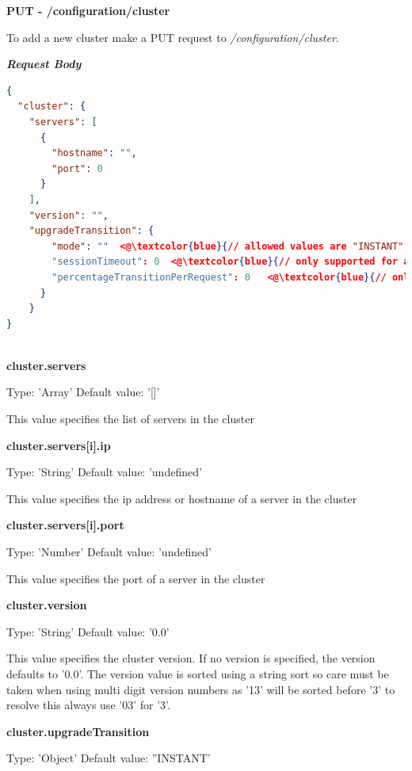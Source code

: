 \documentclass[a4paper,11pt,twoside]{report}
\begin{document}
\noindent
\textbf{PUT - /configuration/cluster}

\noindent
To add a new cluster make a PUT request to \textit{/configuration/cluster}.\bigskip

\noindent
\textit{\textbf{Request Body}}
 
\begin{lstlisting}[language=json]
{
  "cluster": {
    "servers": [
      {
        "hostname": "",
        "port": 0
      }
    ],
    "version": "",
    "upgradeTransition": {
        "mode": ""  <@\textcolor{blue}{// allowed values are "INSTANT", "SESSION", "GRADUAL", "CONCURRENT"}@>
        "sessionTimeout": 0  <@\textcolor{blue}{// only supported for a 'mode' value of "SESSION"}@> 
        "percentageTransitionPerRequest": 0   <@\textcolor{blue}{// only supported for "GRADUAL" mode}@>
      }
    }
}
\end{lstlisting}

\noindent\\
\textbf{cluster.servers}

	\noindent
Type: 'Array'  Default value: '[]'\smallskip

\noindent
This value specifies the list of servers in the cluster\bigskip

\noindent
\textbf{cluster.servers[i].ip}

\noindent
Type: 'String' Default value: 'undefined'\smallskip

\noindent
This value specifies the ip address or hostname of a server in the cluster\bigskip

\noindent
\textbf{cluster.servers[i].port}

\noindent
Type: 'Number' Default value: 'undefined'\smallskip

\noindent
This value specifies the port of a server in the cluster\bigskip

\noindent
\textbf{cluster.version}

\noindent
Type: 'String' Default value: '0.0'\smallskip

\noindent
This value specifies the cluster version. If no version is specified, the version defaults to '0.0'.  The version value is sorted using a string sort so care must be taken when using multi digit version numbers as '13' will be sorted before '3' to resolve this always use '03' for '3'. \bigskip

\noindent
\textbf{cluster.upgradeTransition}

\noindent
Type: 'Object' Default value: ''INSTANT'\smallskip
\end{document}
